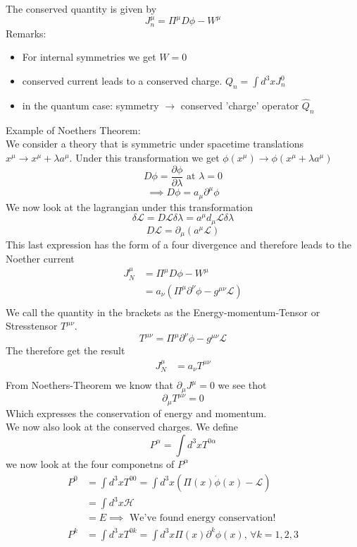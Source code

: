 \documentclass{report}
\begin{document}
The conserved quantity is given by \[
J^\mu_n = \Pi^\mu D \phi - W^\mu
\] Remarks:
\begin{itemize}
	\item For internal symmetries we get $W = 0$
	\item conserved current leads to a conserved charge.  $Q_n = \int d^3x J^0_n$
	\item in the quantum case: symmetry $\to $ conserved 'charge' operator $\hat{Q}_n$
\end{itemize}
Example of Noethers Theorem:\\
We consider a theory that is symmetric under spacetime translations $x^\mu \to x^\mu + \lambda a^\mu$. Under this transformation we get $\phi(x^\mu) \to \phi(x^\mu + \lambda a^\mu)$ \[
D\phi = \frac{\partial \phi}{\partial \lambda } \text{ at } \lambda = 0 
\] \[
\implies D\phi = a_\mu \partial^\mu \phi 
\] We now look at the lagrangian under this transformation \[
\delta \mathcal{L} = D \mathcal{L} \delta\lambda = a^\mu d_\mu \mathcal{L} \delta\lambda
\] \[
D\mathcal{L} = \partial_\mu\left( a^\mu \mathcal{L} \right)   
\] This last expression has the form of a four divergence and therefore leads to the Noether current
\begin{align*}
	J_N^\mu &= \Pi^\mu D\phi - W^\mu\\
	      &= a_\nu \left( \Pi^\mu \partial^\nu \phi - g^{\mu \nu} \mathcal{L}  \right)  \\
\end{align*}
We call the quantity in the brackets as the Energy-momentum-Tensor or Stresstensor $T^{\mu \nu}$. \[
	T^{\mu \nu} = \Pi^\mu \partial^\nu \phi - g^{\mu \nu}\mathcal{L} 
\] The therefore get the result
\begin{align*}
	J_N^\mu &= a_\nu T^{\mu \nu} \\
\end{align*}
From Noethers-Theorem we know that $\partial_\mu J^\mu = 0$ we see thot \[
	\partial_\mu T^{\mu \nu} = 0 
\] Which expresses the conservation of energy and momentum. \\
We now also look at the conserved charges. We define \[
	P^\alpha = \int d^3x T^{0\alpha}
\] we now look at the four componetns of $P^\alpha$
\begin{align*}
	P^0 &= \int d^3x T^{00} = \int d^3x \left( \Pi(x)\dot{\phi}(x) - \mathcal{L} \right)  \\
	    &= \int d^3x \mathcal{H} \\
	    &= E \implies \text{ We've found energy conservation!} \\
	P^k &= \int d^3x T^{0k} = \int d^3x \Pi(x) \partial^k \phi(x) \text{, } \forall k = 1,2,3   \\
\end{align*}
\end{document}
